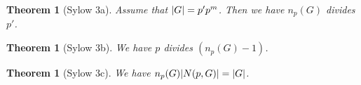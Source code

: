 \documentclass[12pt]{article}
\def\natpow#1#2{{#1}^{#2}}
\def\mult#1#2{m}
\def\SylN#1#2{n_{#1}(#2)}
\def\Nz#1#2{|N(#1,#2)|}
\def\grouporder#1{|#1|}
\newtheorem{theorem}[definition]{Theorem}
\numberwithin{definition}{section}
\begin{document}
\begin{cnl}
\begin{theorem}[Sylow 3a]
Assume that $\grouporder{G} = p'\*\natpow{p}{\mult{p}{G}}$.
Then we have $\SylN{p}{G}$ divides $p'$.
\end{theorem}

\begin{theorem}[Sylow 3b]
We have $p$ divides $(\SylN{p}{G} - 1)$.
\end{theorem}

\begin{theorem}[Sylow 3c]
We have $\SylN{p}{G}\*\Nz{p}{G} = \grouporder{G}$.
\end{theorem}

\end{cnl}
\end{document}
